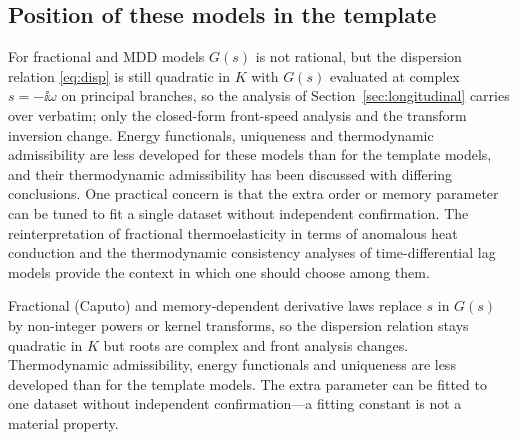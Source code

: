 \subsection{Position of these models in the template}
For fractional and MDD models $G(s)$ is not rational, but the dispersion relation \eqref{eq:disp} is still quadratic in $K$ with $G(s)$ evaluated at complex $s=-\ii\omega$ on principal branches, so the analysis of Section~\ref{sec:longitudinal} carries over verbatim; only the closed-form front-speed analysis and the transform inversion change. Energy functionals, uniqueness and thermodynamic admissibility are less developed for these models than for the template models, and their thermodynamic admissibility has been discussed with differing conclusions. One practical concern is that the extra order or memory parameter can be tuned to fit a single dataset without independent confirmation. The reinterpretation of fractional thermoelasticity in terms of anomalous heat conduction \citep{Yu2024} and the thermodynamic consistency analyses of time-differential lag models \citep{Chirita2016,Tibullo2017} provide the context in which one should choose among them.

\begin{summarybox}[Summary]
Fractional (Caputo) and memory-dependent derivative laws replace $s$ in $G(s)$ by non-integer powers or kernel transforms, so the dispersion relation stays quadratic in $K$ but roots are complex and front analysis changes. Thermodynamic admissibility, energy functionals and uniqueness are less developed than for the template models. The extra parameter can be fitted to one dataset without independent confirmation---a fitting constant is not a material property.
\end{summarybox}
